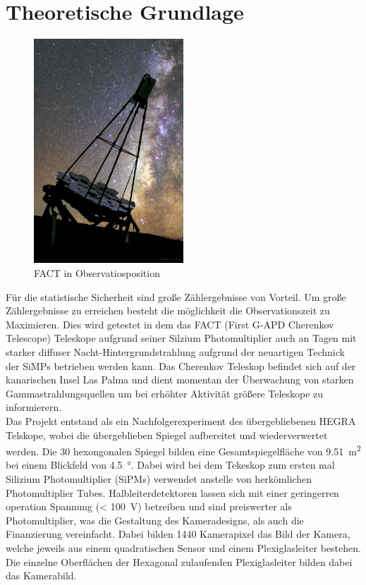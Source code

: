 \chapter{Theoretische Grundlage}
\begin{figure}

  \includegraphics[width=0.5\textwidth]{./logos/FACT.jpg}
  \caption{FACT in Observatiosposition}
  \label{fig:observ}

\end{figure}
Für die statistische Sicherheit sind große Zählergebnisse von Vorteil. Um große Zählergebnisse zu erreichen besteht die möglichkeit die Observationszeit zu Maximieren. Dies wird getestet in dem das FACT (First G-APD Cherenkov Telescope) Teleskope aufgrund seiner Silzium Photomultiplier auch an Tagen mit starker diffuser Nacht-Hintergrundstrahlung aufgrund der neuartigen Technick der SiMPs betrieben werden kann. Das Cherenkov Teleskop befindet sich auf der kanarischen Insel Las Palma und dient momentan der Überwachung von starken Gammastrahlungsquellen um bei erhöhter Aktivität größere Teleskope zu informierern. \\
Das Projekt entstand als ein Nachfolgerexperiment des übergebliebenen HEGRA Telskope, wobei die übergeblieben Spiegel aufbereitet und wiederverwertet werden. Die 30 hexongonalen Spiegel bilden eine Gesamtspiegelfläche von \SI{9.51}{\meter\squared} bei einem Blickfeld von \SI{4.5}{\degree}. Dabei wird bei dem Tekeskop zum ersten mal Silizium Photomultiplier (SiPMs) verwendet anstelle von herkömlichen Photomultiplier Tubes. Halbleiterdetektoren lassen sich mit einer geringerren operation Spannung (< \SI{100}{\volt}) betreiben und sind preiswerter als Photomultiplier, was die Gestaltung des Kameradesigns, als auch die Finanzierung vereinfacht.
Dabei bilden 1440 Kamerapixel das Bild der Kamera, welche jeweils aus einem quadratischen Sensor und einem Plexiglasleiter bestehen. Die einzelne Oberflächen der Hexagonal zulaufenden Plexiglasleiter bilden dabei das Kamerabild.
